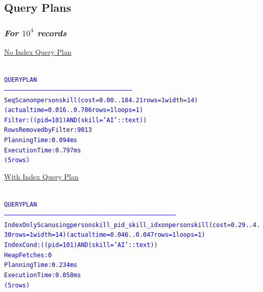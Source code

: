 \documentclass{article}
\begin{document}
  \subsection*{Query Plans}
  \subsubsection*{\emph{For $10^4$ records}}
    \underline{No Index Query Plan}
    \begin{center}
      {\tiny
      \begin{alltt}
      \textcolor{blue}{
        QUERY PLAN                                               
        --------------------------------------------------------------------------------------------------------
         Seq Scan on personskill  (cost=0.00..184.21 rows=1 width=14) (actual time=0.016..0.786 rows=1 loops=1)
           Filter: ((pid = 101) AND (skill = 'AI'::text))
           Rows Removed by Filter: 9013
         Planning Time: 0.094 ms
         Execution Time: 0.797 ms
        (5 rows)
       }
      \end{alltt}
      }
    \end{center}
    \underline{With Index Query Plan}
    \begin{center}
      {\tiny
      \begin{alltt}
      \textcolor{blue}{
        QUERY PLAN                                                                  
        ---------------------------------------------------------------------------------------------------------------------------------------------
         Index Only Scan using personskill_pid_skill_idx on personskill  (cost=0.29..4.30 rows=1 width=14) (actual time=0.046..0.047 rows=1 loops=1)
           Index Cond: ((pid = 101) AND (skill = 'AI'::text))
           Heap Fetches: 0
         Planning Time: 0.234 ms
         Execution Time: 0.058 ms
        (5 rows)
       }
      \end{alltt}
      }
    \end{center}
\end{document}
